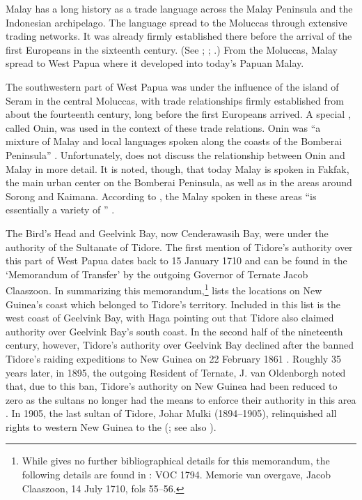 {Malay has a long history as a trade language across the Malay Peninsula and the Indonesian archipelago. The language spread to the Moluccas through extensive trading networks. It was already firmly established there before the arrival of the first Europeans in the sixteenth century. (See \citealt{Adelaar.1996}; \citealt{Collins.1998}; \citealt[42--79]{Paauw.2009}.)  From the Moluccas, Malay spread to West Papua where it developed into today’s Papuan Malay.



The southwestern part of West Papua was under the influence of the island of Seram in the central Moluccas, with trade relationships firmly established from about the fourteenth century, long before the first Europeans arrived. A special , called Onin, was used in the context of these trade relations. Onin was  ``a mixture of Malay and local languages spoken along the coasts of the Bomberai Peninsula'' {\citep[1]{Goodman.2002}}. Unfortunately, {\citet{Goodman.2002}} does not discuss the relationship between Onin and Malay in more detail. It is noted, though, that today Malay is spoken in Fakfak, the main urban center on the Bomberai Peninsula, as well as in the areas around Sorong and Kaimana. According to \citet[2]{Donohue.2003}, the Malay spoken in these areas  ``is essentially a variety of '' \citep[see also][]{Walker.1982}.


The Bird’s Head and Geelvink Bay, now Cenderawasih Bay, were under the authority of the Sultanate of Tidore. The first mention of Tidore’s authority over this part of West Papua dates back to 15 January 1710 and can be found in the  ‘Memorandum of Transfer’ by the outgoing Governor of Ternate Jacob Claaszoon. In summarizing this memorandum,\footnote{While \citet[192--195]{Haga.1884} gives no further bibliographical details for this memorandum, the following details are found in {\citet[262]{Andaya.1993}}: VOC 1794. Memorie van overgave, Jacob Claaszoon, 14 July 1710, fols 55--56.} \citet[192--195]{Haga.1884} lists the locations on New Guinea’s coast which belonged to Tidore’s territory. Included in this list is the west coast of Geelvink Bay, with {Haga} pointing out that Tidore also claimed authority over Geelvink Bay’s south coast. In the second half of the nineteenth century, however, Tidore’s authority over Geelvink Bay declined after the  banned Tidore’s raiding expeditions to New Guinea on 22 February 1861 \citep[28--29]{Bosch.1995}. Roughly 35 years later, in 1895, the outgoing Resident of Ternate, J. van Oldenborgh noted that, due to this ban, Tidore’s authority on New Guinea had been reduced to zero as the sultans no longer had the means to enforce their authority in this area \citep[81]{vanOldenborgh.1995}. In 1905, the last sultan of Tidore, Johar Mulki (1894--1905), relinquished all rights to western New Guinea to the  (\citealt{vanderEng.2004}; see also \citealt[138]{Overweel.1995}).



}
